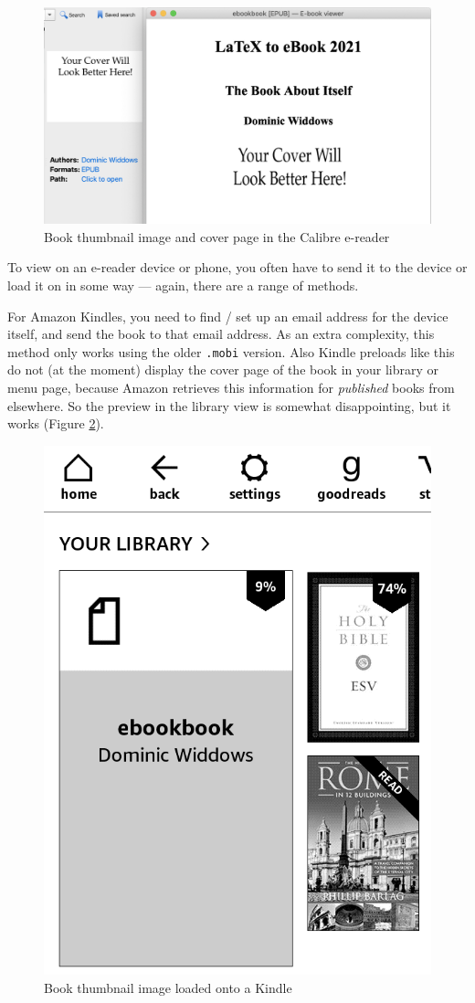 \begin{figure}[ht]
\begin{center}
  \caption{Book thumbnail image and cover page in the Calibre e-reader}
  \label{fig:calibre_screenshot}
  \includegraphics[width=0.8\linewidth]{images/calibre_screenshot.png}
\end{center}
\end{figure}

To view on an e-reader device or phone, you often have to send it to
the device or load it on in some way --- again, there are a range of
methods.

For Amazon Kindles, you need to find / set up an email address for the
device itself, and send the book to that email address. As an extra
complexity, this method only works using the older \texttt{.mobi}
version.  Also Kindle preloads like this do not (at the moment)
display the cover page of the book in your library or menu page,
because Amazon retrieves this information for {\em published} books
from elsewhere. So the preview in the library view is somewhat
disappointing, but it works (Figure \ref{fig:kindle_screenshot}).

\begin{figure}[ht]
\begin{center}
  \caption{Book thumbnail image loaded onto a Kindle}
  \label{fig:kindle_screenshot}
  \includegraphics[width=0.4\linewidth]{images/kindle_screenshot.png}
\end{center}
\end{figure}

